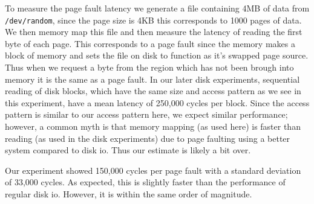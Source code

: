 To measure the page fault latency we generate a file containing 4MB of data from {\tt /dev/random}, since the page size is 4KB this corresponds to 1000 pages of data.  
We then memory map this file and then measure the latency of reading the first byte of each page.  
This corresponds to a page fault since the memory makes a block of memory and sets the file on disk to function as it's swapped page source.
Thus when we request a byte from the region which has not been brough into memory it is the same as a page fault.
In our later disk experiments, sequential reading of disk blocks, which have the same size and access pattern as we see in this experiment, have a mean latency of 250,000 cycles per block.
Since the access pattern is similar to our access pattern here, we expect similar performance; however, a common myth is that memory mapping (as used here) is faster than reading (as used in the disk experiments) due to page faulting using a better system compared to disk io.
Thus our estimate is likely a bit over.

Our experiment showed 150,000 cycles per page fault with a standard deviation of 33,000 cycles.
As expected, this is slightly faster than the performance of regular disk io.
However, it is within the same order of magnitude.